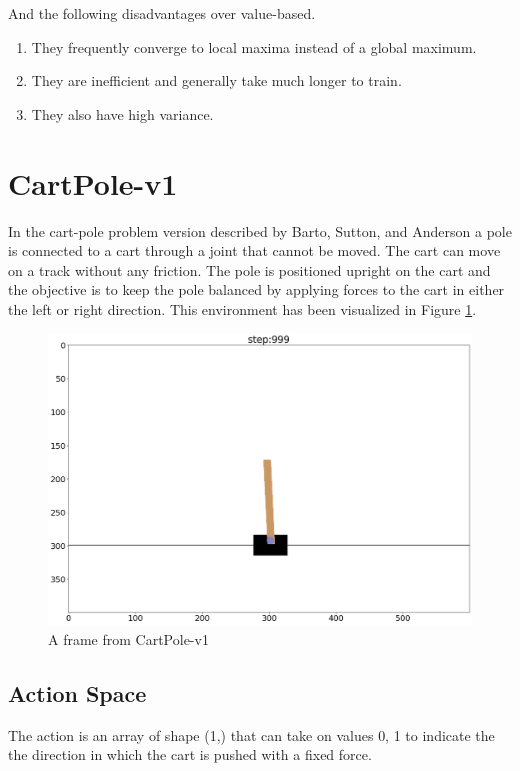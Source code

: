 \documentclass{article} %
\begin{document}
And the following disadvantages over value-based.
\begin{enumerate}
\item They frequently converge to local maxima instead of a global maximum.
\item They are inefficient and generally take much longer to train.
\item They also have high variance.
\end{enumerate}

\section{CartPole-v1}
\label{sec:cart-definition}

In the cart-pole problem version described by Barto, Sutton, and Anderson 
\cite{barto1983neuronlike} a pole is
connected to a cart through a joint that cannot be moved. The cart can move on a track
without any friction. The pole is positioned upright on the cart and the objective is to
keep the pole balanced by applying forces to the cart in either the left or right direction.
This environment has been visualized in Figure \ref{fig:cartpole-rendering}.

\begin{figure}[h]
    \begin{center}
        \includegraphics[width=\textwidth]{cartpole.png}
    \end{center}
    \caption{A frame from CartPole-v1}
    \label{fig:cartpole-rendering}
\end{figure}

\subsection{Action Space}
The action is an array of shape (1,) that can take on values {0, 1} to indicate the
the direction in which the cart is pushed with a fixed force.
\end{document}
